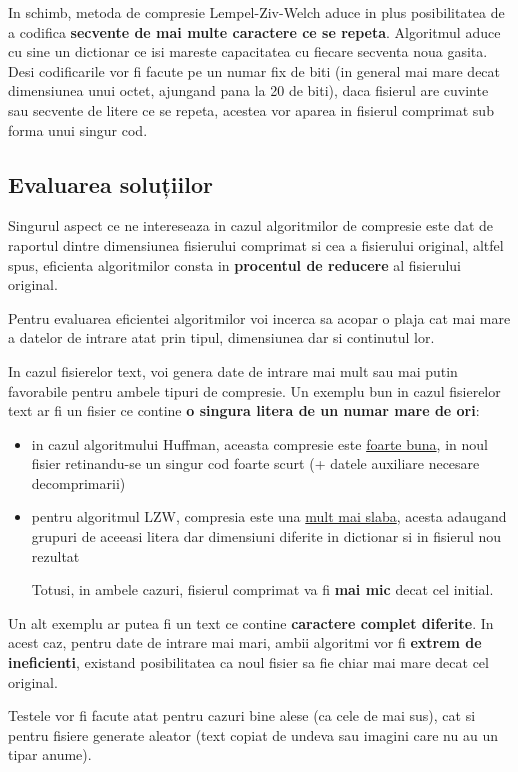 \documentclass[runningheads]{llncs}
\begin{document}
In schimb, metoda de compresie Lempel-Ziv-Welch aduce in plus posibilitatea de
a codifica \textbf{secvente de mai multe caractere ce se repeta}. Algoritmul aduce cu sine
un dictionar ce isi mareste capacitatea cu fiecare secventa noua gasita.
Desi codificarile vor fi facute pe un numar fix de biti (in general mai mare decat
dimensiunea unui octet, ajungand pana la 20 de biti), daca fisierul are cuvinte
sau secvente de litere ce se repeta, acestea vor aparea in fisierul comprimat sub forma
unui singur cod.


\subsection{Evaluarea soluțiilor}
Singurul aspect ce ne intereseaza in cazul algoritmilor de compresie este dat de raportul
dintre dimensiunea fisierului comprimat si cea a fisierului original, altfel spus, eficienta
algoritmilor consta in \textbf{procentul de reducere} al fisierului original.

Pentru evaluarea eficientei algoritmilor voi incerca sa acopar o plaja cat mai mare a
datelor de intrare atat prin tipul, dimensiunea dar si continutul lor.

In cazul fisierelor text, voi genera date de intrare mai mult sau mai putin favorabile
pentru ambele tipuri de compresie. Un exemplu bun in cazul fisierelor text ar fi un fisier
ce contine \textbf{o singura litera de un numar mare de ori}:

\begin{itemize}
    \item in cazul algoritmului Huffman, aceasta compresie este \underline{foarte buna},
    in noul fisier retinandu-se un singur cod foarte scurt (+ datele auxiliare necesare decomprimarii)
    \item pentru algoritmul LZW, compresia este una \underline{mult mai slaba}, acesta adaugand grupuri
    de aceeasi litera dar dimensiuni diferite in dictionar si in fisierul nou rezultat

    Totusi, in ambele cazuri, fisierul comprimat va fi \textbf{mai mic} decat cel initial.
\end{itemize}

Un alt exemplu ar putea fi un text ce contine \textbf{caractere complet diferite}. In acest caz,
pentru date de intrare mai mari, ambii algoritmi vor fi \textbf{extrem de ineficienti}, existand
posibilitatea ca noul fisier sa fie chiar mai mare decat cel original.

Testele vor fi facute atat pentru cazuri bine alese (ca cele de mai sus), cat si pentru
fisiere generate aleator (text copiat de undeva sau imagini care nu au un tipar anume).
\end{document}
